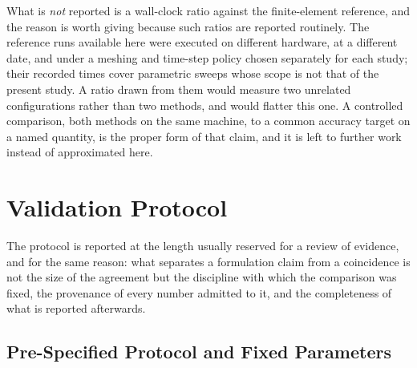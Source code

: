 \documentclass[10pt,a4paper,twocolumn]{article}
\theoremstyle{plain}
\theoremstyle{remark}
\begin{document}
What is \emph{not} reported is a wall-clock ratio against the
finite-element reference, and the reason is worth giving because such
ratios are reported routinely. The reference runs available here were
executed on different hardware, at a different date, and under a
meshing and time-step policy chosen separately for each study; their
recorded times cover parametric sweeps whose scope is not that of the
present study. A ratio drawn from them would measure two unrelated
configurations rather than two methods, and would flatter this one. A
controlled comparison, both methods on the same machine, to a common
accuracy target on a named quantity, is the proper form of that claim,
and it is left to further work instead of approximated here.



%
%
%
%
\section{Validation Protocol}
\label{sec:methods}

The protocol is reported at the length usually reserved for a review of
evidence, and for the same reason: what separates a formulation claim
from a coincidence is not the size of the agreement but the discipline
with which the comparison was fixed, the provenance of every number
admitted to it, and the completeness of what is reported afterwards.

\subsection{Pre-Specified Protocol and Fixed Parameters}
\label{sub:protocol}
\end{document}
